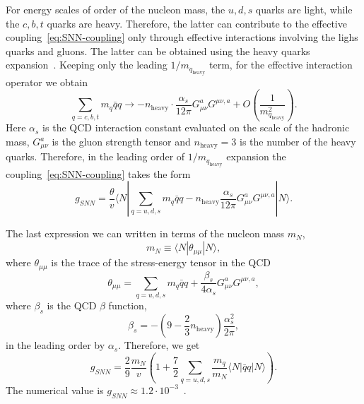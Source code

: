\documentclass[a4paper,12pt,dvipsnames,usernames]{article}
\begin{document}
For energy scales of order of the nucleon mass, the $u,d,s$ quarks are light, while the $c,b,t$ quarks are heavy. Therefore, the latter can contribute to the effective coupling~\eqref{eq:SNN-coupling} only through effective interactions involving the lighs quarks and gluons. The latter can be obtained using the heavy quarks expansion~\cite{Vainshtein:1975sv,Witten:1975bh}. Keeping only the leading $1/m_{q_{\text{heavy}}}$ term, for the effective interaction operator we obtain~\cite{Shifman:1978zn}
\begin{equation}
\label{eq:hqeft}
\sum_{q = c,b,t}m_{q}\bar{q}q \to -n_{\text{heavy}}\cdot \frac{\alpha_{s}}{12\pi}G_{\mu\nu}^{a}G^{\mu\nu,a} + O\left(\frac{1}{m_{q_{\text{heavy}}}^{2}}\right).
\end{equation}
Here $\alpha_{s}$ is the QCD interaction constant evaluated on the scale of the hadronic mass, $G_{\mu\nu}^{a}$ is the gluon strength tensor and $n_{\text{heavy}} = 3$ is the number of the heavy quarks. Therefore, in the leading order of $1/m_{q_{\text{heavy}}}$ expansion the coupling~\eqref{eq:SNN-coupling} takes the form~\cite{Shifman:1978zn,Cheng:1988im}
\begin{equation}
\label{eq:SN1}
g_{SNN} = \frac{\theta}{v}\langle N|\sum_{q = u,d,s}m_{q}\bar{q}q -n_{\text{heavy}}\frac{\alpha_{s}}{12\pi}G_{\mu\nu}^{a}G^{\mu\nu,a}|N\rangle.
\end{equation}

The last expression we can written in terms of the nucleon mass $m_{N}$,
\begin{equation}
m_{N} \equiv \langle N|\theta_{\mu\mu}|N \rangle,     
\end{equation}
where $\theta_{\mu\mu}$ is the trace of the stress-energy tensor in the QCD~\cite{Shifman:1978zn}
\begin{equation}
\label{eq:trace}
\theta_{\mu\mu} = \sum_{q = u,d,s}m_{q}\bar{q}q +\frac{\beta_{s}}{4 \alpha_{s}}G_{\mu\nu}^{a}G^{\mu\nu,a},
\end{equation}
where $\beta_{s}$ is the QCD $\beta$ function,
\begin{equation}
\beta_{s} = -\left(9-\frac{2}{3}n_{\text{heavy}}\right)\frac{\alpha_{s}^{2}}{2\pi},
\end{equation}
in the leading order by $\alpha_s$.
Therefore, we get~\cite{Shifman:1978zn,Cheng:1988im}
\begin{equation}
g_{S NN} =\frac{2}{9}\frac{m_{N}}{v}\left( 1 + \frac{7}{2}\sum_{q = u,d,s}\frac{m_{q}}{m_{N}}\langle N|\bar{q}q|N\rangle\right).
\end{equation}
The numerical value is $g_{SNN} \approx 1.2\cdot 10^{-3}$~\cite{Cheng:2012qr}.
\end{document}
